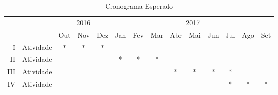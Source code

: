 \begin{table*}[!ht]
	\centering
	\caption{Cronograma Esperado}
	\begin{tabular}{|r l|c|c|c|c|c|c|c|c|c|c|c|c|} \hline
		\multirow{2}{*}{}& \multirow{2}{*}{}	& \multicolumn{3}{c|}{2016}	& \multicolumn{9}{c|}{2017}   				\\ \cline{3-14}
				&   							& Out & Nov & Dez & Jan & Fev & Mar & Abr & Mai & Jun & Jul & Ago & Set \\ \hline
		I		& Atividade 					& *  & *  & *  &    &    &    &    &    &    &    &    &    			\\ \hline
		II		& Atividade 					&    &    &    & *  & *  & *  &    &    &    &    &    &    			\\ \hline
		III		& Atividade 					&    &    &    &    &    &    & *  & *  & *  & *  &    &    			\\ \hline
		IV		& Atividade 					&    &    &    &    &    &    &    &    &    & *  & *  & *  			\\ \hline
	\end{tabular}
	\label{t:cronograma}
\end{table*}